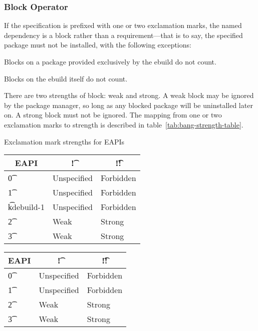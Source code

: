 \subsubsection{Block Operator}

If the specification is prefixed with one or two exclamation marks, the named dependency is a block
rather than a requirement---that is to say, the specified package must not be installed, with the
following exceptions:

\begin{compactitem}
\item Blocks on a package provided exclusively by the ebuild do not count. \label{provided-blocks}
\item Blocks on the ebuild itself do not count.
\end{compactitem}

There are two strengths of block: weak and strong. A weak block may be ignored by the package
manager, so long as any blocked package will be uninstalled later on. A strong block must not be
ignored. The mapping from one or two exclamation marks to strength is described in
table~\ref{tab:bang-strength-table}.

\begin{centertable}{Exclamation mark strengths for EAPIs} \label{tab:bang-strength-table}
\IFKDEBUILDELSE
{
    \begin{tabular}{ l l l }
        \toprule
            \multicolumn{1}{c}{\textbf{EAPI}} &
            \multicolumn{1}{c}{\textbf{\t{!}}} &
            \multicolumn{1}{c}{\textbf{\t{!!}}} \\
            \midrule
    \t{0} & Unspecified & Forbidden \\
    \t{1} & Unspecified & Forbidden \\
    \t{kdebuild-1} & Unspecified & Forbidden \\
    \t{2} & Weak & Strong \\
    \t{3} & Weak & Strong \\
    \bottomrule
    \end{tabular}
}{
    \begin{tabular}{ l l l }
        \toprule
            \multicolumn{1}{c}{\textbf{EAPI}} &
            \multicolumn{1}{c}{\textbf{\t{!}}} &
            \multicolumn{1}{c}{\textbf{\t{!!}}} \\
            \midrule
    \t{0} & Unspecified & Forbidden \\
    \t{1} & Unspecified & Forbidden \\
    \t{2} & Weak & Strong \\
    \t{3} & Weak & Strong \\
    \bottomrule
    \end{tabular}
}
\end{centertable}

